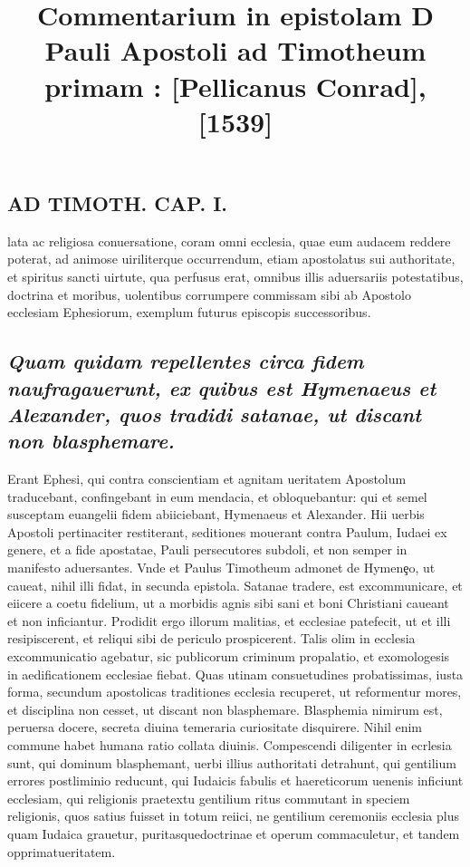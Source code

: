 \documentclass{article}
\begin{document}
\date{}
        \title{Commentarium in epistolam D Pauli Apostoli ad Timotheum primam : [Pellicanus Conrad], [1539]}
\maketitle
\tableofcontents
\clearpage
\begin{pages} 
\beginnumbering
        
\section*{AD TIMOTH. CAP. I. }
\marginpar{[ p.479 ]}\pstart lata ac religiosa conuersatione, coram omni ecclesia, quae eum audacem reddere poterat, ad animose uiriliterque  occurrendum, etiam apostolatus sui authoritate, et spiritus sancti uirtute, qua perfusus erat, omnibus illis aduersariis potestatibus, doctrina et moribus, uolentibus corrumpere commissam sibi ab Apostolo ecclesiam Ephesiorum, exemplum futurus episcopis successoribus.  \pend
{}
{}
\subsection*{\textit{Quam quidam repellentes circa fidem naufragauerunt, ex quibus est Hymenaeus et Alexander, quos tradidi satanae, ut discant non blasphemare. }}\pstart Erant Ephesi, qui contra conscientiam et agnitam ueritatem Apostolum traducebant, confingebant in eum mendacia, et obloquebantur: qui et semel susceptam euangelii fidem abiiciebant, Hymenaeus et Alexander. Hii uerbis Apostoli pertinaciter restiterant, seditiones mouerant contra Paulum, Iudaei ex genere, et a fide apostatae, Pauli persecutores subdoli, et non semper in manifesto aduersantes. Vnde et Paulus Timotheum admonet de Hymenȩo, ut caueat, nihil illi fidat, in secunda epistola. Satanae tradere, est excommunicare, et eiicere a coetu fidelium, ut a morbidis agnis sibi sani et boni Christiani caueant et non inficiantur. Prodidit ergo illorum malitias, et ecclesiae patefecit, ut et illi resipiscerent, et reliqui sibi de periculo prospicerent. Talis olim in ecclesia excommunicatio agebatur, sic publicorum criminum propalatio, et exomologesis in aedificationem ecclesiae fiebat. Quas utinam consuetudines probatissimas, iusta forma, secundum apostolicas traditiones ecclesia recuperet, ut reformentur mores, et disciplina non cesset, ut discant non blasphemare. Blasphemia nimirum est, peruersa docere, secreta diuina temeraria curiositate disquirere. Nihil enim commune habet humana ratio collata diuinis. Compescendi diligenter in ecrlesia sunt, qui dominum blasphemant, uerbi illius authoritati detrahunt, qui gentilium errores postliminio reducunt, qui Iudaicis fabulis et haereticorum uenenis inficiunt ecclesiam, qui religionis praetextu gentilium ritus commutant in speciem religionis, quos satius fuisset in totum reiici, ne gentilium ceremoniis ecclesia plus quam Iudaica grauetur, puritasquedoctrinae et operum commaculetur, et tandem opprimatueritatem.  \pend

\end{pages}
\end{document}

